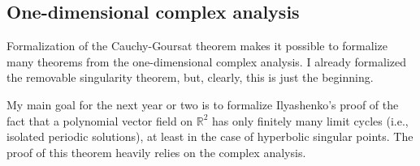 \documentclass[a4paper, UKenglish,cleveref, autoref, thm-restate]{lipics-v2021}
\newcommand{\bbR}{\mathbb{R}}
\begin{document}
\subsection{One-dimensional complex analysis}%
\label{sec:one-dimens-compl}

Formalization of the Cauchy-Goursat theorem makes it possible to
formalize many theorems from the one-dimensional complex analysis. I
already formalized the removable singularity theorem, but, clearly,
this is just the beginning.

My main goal for the next year or two is to formalize Ilyashenko's
proof of the fact that a polynomial vector field on \(\bbR^{2}\) has
only finitely many limit cycles (i.e., isolated periodic solutions),
at least in the case of hyperbolic singular points. The proof of this
theorem heavily relies on the complex analysis.


\end{document}

